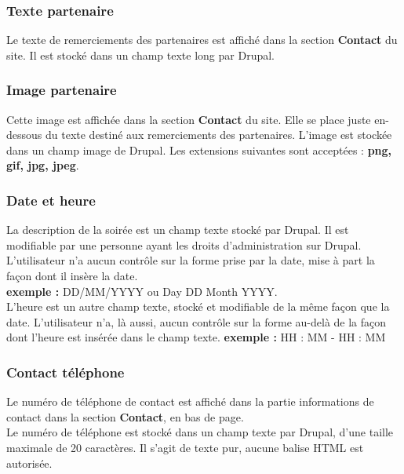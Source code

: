 \documentclass[11pt]{report}
\begin{document}
\subsubsection{Texte partenaire}

Le texte de remerciements des partenaires est affiché dans la section
\textbf{Contact} du site. Il est stocké dans un champ texte long par Drupal. \\

\subsubsection{Image partenaire}

Cette image est affichée dans la section \textbf{Contact} du site. Elle se place
juste en-dessous du texte destiné aux remerciements des partenaires.
L'image est stockée dans un champ image de Drupal.
Les extensions suivantes sont acceptées : \textbf{png, gif, jpg, jpeg}.

\subsubsection{Date et heure}

La description de la soirée est un champ texte stocké par Drupal. Il est
modifiable par une personne ayant les droits d'administration sur Drupal.
L'utilisateur n'a aucun contrôle sur la forme prise par la date, mise à part la
façon dont il insère la date. \\
\textbf{exemple :} DD/MM/YYYY ou Day DD Month YYYY. \\

L'heure est un autre champ texte, stocké et modifiable de la même façon que la
date.
L'utilisateur n'a, là aussi, aucun contrôle sur la forme au-delà de la façon
dont l'heure est insérée dans le champ texte.
\textbf{exemple :} HH : MM - HH : MM \\

\subsubsection{Contact téléphone}

Le numéro de téléphone de contact est affiché dans la partie informations de
contact dans la section \textbf{Contact}, en bas de page. \\
Le numéro de téléphone est stocké dans un champ texte par Drupal, d'une taille
maximale de 20 caractères. Il s'agit de texte pur, aucune balise HTML est autorisée.
\end{document}
